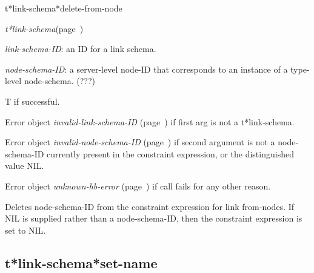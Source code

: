 \begin{description}
\item [Name:]  t*link-schema*delete-from-node

\item [Class:] {\sl t*link-schema}\hfill(page~\pageref{t*link-schema})

\item [Parameters:]
\item {\sl link-schema-ID}:  an ID for a link schema.

\item {\sl node-schema-ID}:  a server-level node-ID that corresponds to an 
instance of a type-level node-schema. (???)



\item [Return-value:]
T if successful.

Error object {\sl invalid-link-schema-ID} (page~\pageref{invalid-link-schema-ID}) if first
arg is not a t*link-schema.

Error object {\sl invalid-node-schema-ID} (page~\pageref{invalid-node-schema-ID}) if second
argument is not a node-schema-ID currently present
in the constraint expression, or the distinguished
value NIL.

Error object {\sl unknown-hb-error} (page~\pageref{unknown-hb-error}) if call fails
for any other reason.

\item [Description:]

Deletes node-schema-ID from the constraint expression
for link from-nodes.  If NIL is supplied rather than
a node-schema-ID, then the constraint expression
is set to NIL.


\item [Public:]



\end{description}
\horizontalline

\subsection{t*link-schema*set-name}
\label{t*link-schema*set-name}

